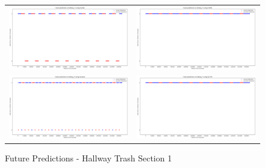 \begin{figure}
  \begin{tabular}{cc}
    {\includegraphics[width = 3in]{images/results/Future_hallway_T1_Duckett.png}} &
    {\includegraphics[width = 3in]{images/results/Future_hallway_T1_FreMEn.png}} \\
    {\includegraphics[width = 3in]{images/results/Future_hallway_T1_Gaussian.png}} &
    {\includegraphics[width = 3in]{images/results/Future_hallway_T1_HyT-EM.png}} \\
  \end{tabular}
  \caption{Future Predictions - Hallway Trash Section 1}
\end{figure}

